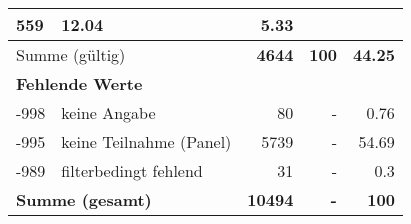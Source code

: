 \begin{longtable}{lXrrr}
       \num{559} &
       \num[round-mode=places,round-precision=2]{12.04} &
         \num[round-mode=places,round-precision=2]{5.33} \\
     \midrule
     \multicolumn{2}{l}{Summe (gültig)} &
       \textbf{\num{4644}} &
     \textbf{\num{100}} &
       \textbf{\num[round-mode=places,round-precision=2]{44.25}} \\
     \multicolumn{5}{l}{\textbf{Fehlende Werte}}\\
       -998 &
       keine Angabe &
         \num{80} &
        - &
         \num[round-mode=places,round-precision=2]{0.76} \\
       -995 &
       keine Teilnahme (Panel) &
         \num{5739} &
        - &
         \num[round-mode=places,round-precision=2]{54.69} \\
       -989 &
       filterbedingt fehlend &
         \num{31} &
        - &
         \num[round-mode=places,round-precision=2]{0.3} \\
     \midrule
     \multicolumn{2}{l}{\textbf{Summe (gesamt)}} &
          \textbf{\num{10494}} &
        \textbf{-} &
        \textbf{\num{100}} \\
     \bottomrule
     \end{longtable}
     
